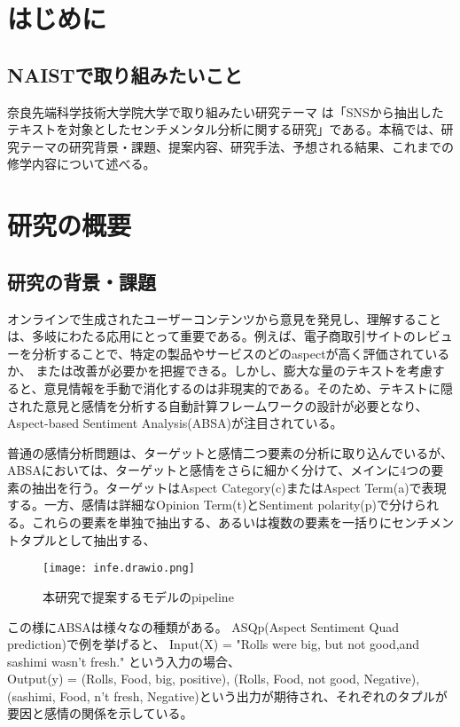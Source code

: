 \documentclass[a4j,10pt, twocolumn]{jarticle} \usepackage[dvipdfmx]{graphicx} \usepackage{amssymb} \usepackage{amsmath}
\begin{document}

\section{はじめに}
\subsection{NAISTで取り組みたいこと}
奈良先端科学技術大学院大学で取り組みたい研究テーマ は「SNSから抽出したテキストを対象としたセンチメンタル分析に関する研究」である。本稿では、研究テーマの研究背景・課題、提案内容、研究手法、予想される結果、これまでの修学内容について述べる。

\section{研究の概要}
\subsection{研究の背景・課題 }
オンラインで生成されたユーザーコンテンツから意見を発見し、理解することは、多岐にわたる応用にとって重要である。例えば、電子商取引サイトのレビューを分析することで、特定の製品やサービスのどのaspectが高く評価されているか、
または改善が必要かを把握できる。しかし、膨大な量のテキストを考慮すると、意見情報を手動で消化するのは非現実的である。そのため、テキストに隠された意見と感情を分析する自動計算フレームワークの設計が必要となり、Aspect-based Sentiment Analysis(ABSA)が注目されている。

普通の感情分析問題は、ターゲットと感情二つ要素の分析に取り込んでいるが\cite{liu}、ABSAにおいては、ターゲットと感情をさらに細かく分けて、メインに4つの要素の抽出を行う。ターゲットはAspect Category(c)またはAspect Term(a)で表現する。一方、感情は詳細なOpinion Term(t)とSentiment polarity(p)で分けられる。これらの要素を単独で抽出する、あるいは複数の要素を一括りにセンチメントタプルとして抽出する、
\begin{figure}[b]
    \centering
    \texttt{[image: infe.drawio.png]}
    \caption{本研究で提案するモデルのpipeline}
    \label{fig:enter-label}
\end{figure}この様にABSAは様々なの種類がある。
ASQp(Aspect Sentiment Quad prediction)で例を挙げると、
Input(X) = "Rolls were big, but not good,and sashimi wasn't fresh." という入力の場合、\\
Output(y) = (Rolls, Food, big, positive), (Rolls, Food, not good, Negative),(sashimi, Food, n't fresh, Negative)という出力が期待され、それぞれのタプルが要因と感情の関係を示している。
\end{document}
